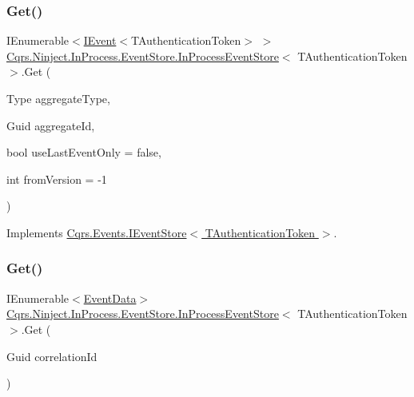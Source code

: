 \subsubsection{\texorpdfstring{Get()}{Get()}\hspace{0.1cm}{\footnotesize\ttfamily [1/2]}}
{\footnotesize\ttfamily I\+Enumerable$<$\hyperlink{interfaceCqrs_1_1Events_1_1IEvent}{I\+Event}$<$T\+Authentication\+Token$>$ $>$ \hyperlink{classCqrs_1_1Ninject_1_1InProcess_1_1EventStore_1_1InProcessEventStore}{Cqrs.\+Ninject.\+In\+Process.\+Event\+Store.\+In\+Process\+Event\+Store}$<$ T\+Authentication\+Token $>$.Get (\begin{DoxyParamCaption}\item[{Type}]{aggregate\+Type,  }\item[{Guid}]{aggregate\+Id,  }\item[{bool}]{use\+Last\+Event\+Only = {\ttfamily false},  }\item[{int}]{from\+Version = {\ttfamily -\/1} }\end{DoxyParamCaption})}



Implements \hyperlink{interfaceCqrs_1_1Events_1_1IEventStore_ae02ef6c804d0c4a92705a447bc4b2214_ae02ef6c804d0c4a92705a447bc4b2214}{Cqrs.\+Events.\+I\+Event\+Store$<$ T\+Authentication\+Token $>$}.

\mbox{\label{classCqrs_1_1Ninject_1_1InProcess_1_1EventStore_1_1InProcessEventStore_ae07e89f6a8ca48d7d7f25d8a52703fbd_ae07e89f6a8ca48d7d7f25d8a52703fbd}} 
\subsubsection{\texorpdfstring{Get()}{Get()}\hspace{0.1cm}{\footnotesize\ttfamily [2/2]}}
{\footnotesize\ttfamily I\+Enumerable$<$\hyperlink{classCqrs_1_1Events_1_1EventData}{Event\+Data}$>$ \hyperlink{classCqrs_1_1Ninject_1_1InProcess_1_1EventStore_1_1InProcessEventStore}{Cqrs.\+Ninject.\+In\+Process.\+Event\+Store.\+In\+Process\+Event\+Store}$<$ T\+Authentication\+Token $>$.Get (\begin{DoxyParamCaption}\item[{Guid}]{correlation\+Id }\end{DoxyParamCaption})}




